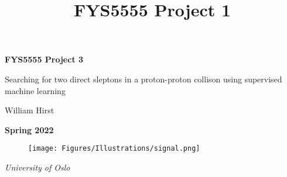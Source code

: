 \documentclass{article}
\begin{document}
\title{FYS5555 Project 1}
\date{}
\begin{titlepage}
\centering
{\LARGE\bfseries FYS5555 Project 3}

\vspace{1cm}

{\Large Searching for two direct sleptons in a proton-proton collison using supervised machine learning}

\vspace{1.5cm}

{\large William Hirst}

\vspace{1cm}

{\bfseries Spring 2022}

\vspace{2cm}

\begin{figure}[H]
    \centering
    \texttt{[image: Figures/Illustrations/signal.png]}
    \label{fig:signal}
\end{figure}

\vfill

{\itshape University of Oslo}
\end{titlepage}
\newpage
\pagestyle{fancy}
\fancyfoot{}
\fancyfoot[R]{\thepage}

\begin{center}
\centering
\textit{
\lipsum[2]
}
\end{center}
\end{document}
